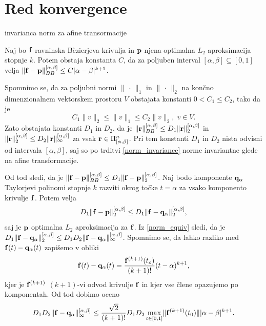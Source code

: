 
\section{Red konvergence}

\begin{trditev}\label{norm_invariance}

invarianca norm za afine transormacije 
\end{trditev}
\proof

\endproof

\begin{lema}\label{prvalema}
Naj bo ${\bf f}$ ravninska B\`{e}zierjeva krivulja in ${\bf p}$ njena optimalna $L_2$ aproksimacija stopnje $k$. Potem obstaja konstanta $C$, da za poljuben interval $[\alpha,\beta]\subseteq[0,1]$ velja $\lVert {\bf f} - {\bf p} \rVert _{BB}^{[\alpha,\beta]} \leq C |\alpha - \beta|^{k+1}$.
\end{lema}
\proof
Spomnimo se, da za poljubni normi $\lVert\, \cdot\, \rVert _1$ in $\lVert\, \cdot \,\rVert _2$ na končno dimenzionalnem vektorskem prostoru $V$ obstajata konstanti $0 < C_1 \leq C_2$, tako da je 
\begin{equation}\label{norm_equiv}
C_1 \lVert v\rVert _2 \leq \lVert v\rVert _1 \leq C_2 \lVert v\rVert _2, \; v\in V.
\end{equation}
Zato obstajata konstanti $D_1$ in $D_2$, da je $\lVert {\bf r}\rVert _{BB}^{[\alpha,\beta]} \leq D_1 \lVert {\bf r}\rVert _2^{[\alpha,\beta]}$ in $\lVert {\bf r}\rVert _{2}^{[\alpha,\beta]} \leq D_2 \lVert {\bf r}\rVert _\infty^{[\alpha,\beta]}$ za vsak ${\bf r}\in  \Pi _{[\alpha,\beta]}^n$. Pri tem konstanti $D_1$ in $D_2$ nista odvisni od intervala $[\alpha,\beta]$, saj so po trditvi \ref{norm_invariance} norme invariantne glede na afine transformacije.

Od tod sledi, da je 
$\lVert {\bf f} - {\bf p} \rVert _{BB}^{[\alpha,\beta]} \leq D_1 \lVert {\bf f} - {\bf p} \rVert _{2}^{[\alpha,\beta]}$. Naj bodo komponente ${\bf q}_\alpha$ Taylorjevi polinomi stopnje $k$ razviti okrog točke $t = \alpha$ za vsako komponento krivulje ${\bf f}$. Potem velja
$$
D_1 \lVert {\bf f} - {\bf p} \rVert _{2}^{[\alpha,\beta]} \leq D_1 \lVert {\bf f} - {\bf q}_\alpha \rVert _{2}^{[\alpha,\beta]},
$$
saj je ${\bf p}$ optimalna $L_2$ aproksimacija za ${\bf f}$. Iz \ref{norm_equiv} sledi, da je 
$
D_1 \lVert {\bf f} - {\bf q}_\alpha \rVert _{2}^{[\alpha,\beta]} \leq D_1D_2 \lVert {\bf f} - {\bf q}_\alpha \rVert _{\infty}^{[\alpha,\beta]}
$. Spomnimo se, da lahko razliko med ${\bf f}(t) - {\bf q}_\alpha(t)$ zapišemo v obliki
$$
{\bf f}(t) - {\bf q}_\alpha(t) = \frac{{\bf f}^{(k+1)}(t_o)}{(k+1)!}(t-\alpha)^{k+1},
$$
kjer je ${\bf f}^{(k+1)}$ $(k+1)$-vi odvod krivulje ${\bf f}$ in kjer vse člene opazujemo po komponentah. Od tod dobimo oceno
$$
D_1D_2 \lVert {\bf f} - {\bf q}_\alpha \rVert _{\infty}^{[\alpha,\beta]} \leq
\frac{\sqrt{2}}{(k+1)!}D_1D_2\max _{t\in [0,1]} \lVert {\bf f}^{(k+1)}(t_0) \rVert |\alpha - \beta|^{k+1}.
$$
\endproof

